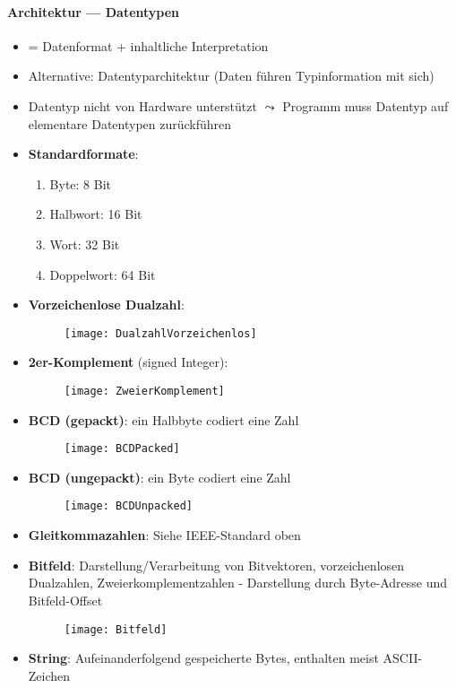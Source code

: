 \paragraph{Architektur --- Datentypen}
\begin{itemize}
	\item = Datenformat + inhaltliche Interpretation
	\item Alternative: Datentyparchitektur (Daten führen Typinformation mit sich)
	\item Datentyp nicht von Hardware unterstützt $\leadsto$ Programm muss Datentyp auf elementare Datentypen zurückführen
	\item \textbf{Standardformate}:
	\begin{enumerate}
		\item Byte: 8 Bit
		\item Halbwort: 16 Bit
		\item Wort: 32 Bit
		\item Doppelwort: 64 Bit
	\end{enumerate}
	\item \textbf{Vorzeichenlose Dualzahl}:
	\begin{figure}[ht]
	  \centering
	  \texttt{[image: DualzahlVorzeichenlos]}
	  \label{DualzahlVorzeichenlos}
	\end{figure}
	\item \textbf{2er-Komplement} (signed Integer):
	\begin{figure}[ht]
	  \centering
	  \texttt{[image: ZweierKomplement]}
	  \label{ZweierKomplement}
	\end{figure}
	\item \textbf{BCD (gepackt)}: ein Halbbyte codiert eine Zahl
	\begin{figure}[ht]
	  \centering
	  \texttt{[image: BCDPacked]}
	  \label{BCDPacked}
	\end{figure}
	\item \textbf{BCD (ungepackt)}: ein Byte codiert eine Zahl
	\begin{figure}[ht]
	  \centering
	  \texttt{[image: BCDUnpacked]}
	  \label{BCDUnpacked}
	\end{figure}
	\item \textbf{Gleitkommazahlen}: Siehe IEEE-Standard oben
	\item \textbf{Bitfeld}: Darstellung/Verarbeitung von Bitvektoren, vorzeichenlosen Dualzahlen, Zweierkomplementzahlen - Darstellung durch Byte-Adresse und Bitfeld-Offset
	\begin{figure}[ht]
	  \centering
	  \texttt{[image: Bitfeld]}
	  \label{Bitfeld}
	\end{figure}
	\item \textbf{String}: Aufeinanderfolgend gespeicherte Bytes, enthalten meist ASCII-Zeichen
\end{itemize}


